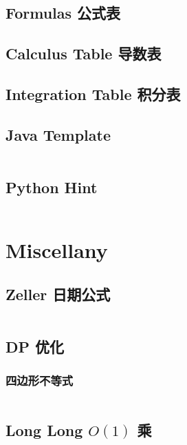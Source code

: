 \documentclass[titlepage, a4paper]{article}
\newcommand\nothing{}
\renewcommand{\checkmark}[0]{\nothing}
\begin{document}
\begin{multicols}{2}
\begin{spacing}{0.6}
\begin{spacing}{0.5}
				\subsection{Formulas 公式表}
				
				\subsection{Calculus Table 导数表}
				
				\subsection{Integration Table 积分表}
				
				\subsection{Java Template}
				\inputminted{java}{src/Miscellany/Main.java}
				\subsection{Python Hint}
				\inputminted{python}{src/Miscellany/py.py}
				\end{spacing}

			\section{Miscellany}
				\subsection{Zeller 日期公式\checkmark}
				\inputminted{cpp}{src/Miscellany/日期公式.cpp}
				\subsection{DP 优化}
				\subsubsection{四边形不等式\checkmark}
				\inputminted{cpp}{src/Miscellany/2D1D.cpp}
				
				\subsection{Long Long $O(1)$ 乘\checkmark}
				\inputminted{cpp}{src/Miscellany/LLFPM.cpp}

\end{spacing}
\end{multicols}
\end{document}
